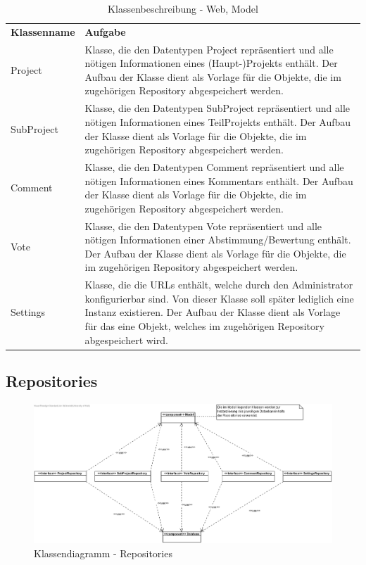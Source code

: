 \begin{table}[H]
	\centering
	\begin{tabularx}{\textwidth}{X X}
		\rowcolor[HTML]{C0C0C0} 
		\textbf{Klassenname} & \textbf{Aufgabe} \\
		Project & Klasse, die den Datentypen Project repräsentiert und alle nötigen Informationen eines (Haupt-)Projekts enthält. Der Aufbau der Klasse dient als Vorlage für die Objekte, die im zugehörigen Repository abgespeichert werden. \\
		\rowcolor[HTML]{E7E7E7} 
		 SubProject &  Klasse, die den Datentypen SubProject repräsentiert und alle nötigen Informationen eines TeilProjekts enthält. Der Aufbau der Klasse dient als Vorlage für die Objekte, die im zugehörigen Repository abgespeichert werden. \\
		Comment & Klasse, die den Datentypen Comment repräsentiert und alle nötigen Informationen eines Kommentars enthält. Der Aufbau der Klasse dient als Vorlage für die Objekte, die im zugehörigen Repository abgespeichert werden. \\
		\rowcolor[HTML]{E7E7E7} 
		Vote & Klasse, die den Datentypen Vote repräsentiert und alle nötigen Informationen einer Abstimmung/Bewertung enthält. Der Aufbau der Klasse dient als Vorlage für die Objekte, die im zugehörigen Repository abgespeichert werden. \\
		Settings & Klasse, die die URLs enthält, welche durch den Administrator konfigurierbar sind. Von dieser Klasse soll später lediglich eine Instanz existieren. Der Aufbau der Klasse dient als Vorlage für das eine Objekt, welches im zugehörigen Repository abgespeichert wird.  \\
	\end{tabularx}
	\caption{Klassenbeschreibung - Web, Model}
	\label{table:klassenbeschreibung-web-model}
\end{table}

\subsection{Repositories}
\begin{figure}[H]
	\centering
	\includegraphics[width=\textwidth]{img/classrepo.png}	
	\caption{Klassendiagramm - Repositories}
	\label{fig:klassendiagramm-repo}
\end{figure}

